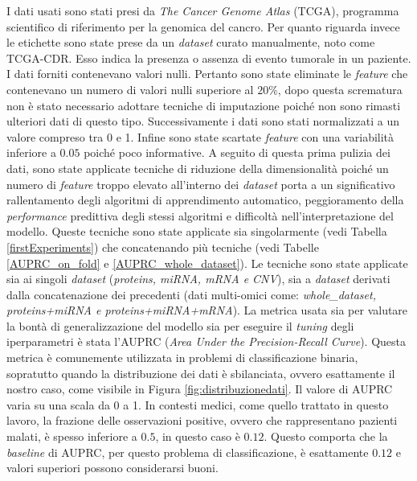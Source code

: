 \documentclass[12pt,italian]{report}
\begin{document}
	I dati usati sono stati presi da \textit{The Cancer Genome Atlas} (TCGA), programma scientifico di riferimento per la genomica del cancro. Per quanto riguarda invece le etichette sono state prese da un \textit{dataset} curato manualmente, noto come TCGA-CDR. Esso indica la presenza o assenza di evento tumorale in un paziente.
	I dati forniti contenevano valori nulli. Pertanto sono state eliminate le \textit{feature} che contenevano un numero di valori nulli superiore al $20\%$, dopo questa scrematura non è stato necessario adottare tecniche di imputazione poiché non sono rimasti ulteriori dati di questo tipo. Successivamente i dati sono stati normalizzati a un valore compreso tra 0 e 1.
	Infine sono state scartate \textit{feature} con una variabilità inferiore a $0.05$ poiché poco informative. 
	A seguito di questa prima pulizia dei dati, sono state applicate tecniche di riduzione della dimensionalità poiché un numero di \textit{feature} troppo elevato all'interno dei \textit{dataset} porta a un significativo rallentamento degli algoritmi di apprendimento automatico, peggioramento della \textit{performance} predittiva degli stessi algoritmi e difficoltà nell'interpretazione del modello. Queste tecniche sono state applicate sia singolarmente (vedi Tabella \ref{firstExperiments}) che concatenando più tecniche (vedi Tabelle \ref{AUPRC_on_fold} e \ref{AUPRC_whole_dataset}). Le tecniche sono state applicate sia ai singoli \textit{dataset} (\textit{proteins, miRNA, mRNA e CNV}), sia a \textit{dataset} derivati dalla concatenazione dei precedenti (dati multi-omici come: \textit{whole\_dataset, proteins+miRNA e proteins+miRNA+mRNA}). La metrica usata sia per valutare la bontà di generalizzazione del modello sia per eseguire il \textit{tuning} degli iperparametri è stata l'AUPRC (\textit{Area Under the Precision-Recall Curve}). Questa metrica è comunemente utilizzata in problemi di classificazione binaria, sopratutto quando la distribuzione dei dati è sbilanciata, ovvero esattamente il nostro caso, come visibile in Figura \ref{fig:distribuzionedati}. Il valore di AUPRC varia su una scala da 0 a 1. In contesti medici, come quello trattato in questo lavoro, la frazione delle osservazioni positive, ovvero che rappresentano pazienti malati, è spesso inferiore a $0.5$, in questo caso è $0.12$. Questo comporta che la \textit{baseline} di AUPRC, per questo problema di classificazione, è esattamente $0.12$ e valori superiori possono considerarsi buoni.
	
\end{document}
